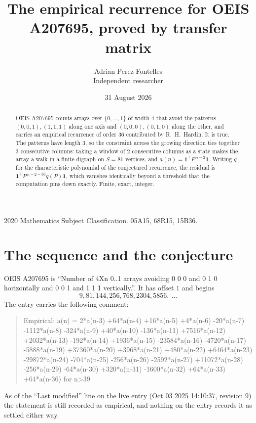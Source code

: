 \documentclass[11pt,a4paper]{article}
\title{The empirical recurrence for OEIS A207695, proved by transfer matrix}
\author{Adrian Perez Fontelles\\ \small Independent researcher}
\date{31 August 2026}
\theoremstyle{plain}
\theoremstyle{definition}
\begin{document}
\maketitle

\begin{abstract}
OEIS A207695 counts arrays over $\{0,\dots,1\}$ of width $4$ that avoid the patterns
$(0,0,1), (1,1,1)$ along one axis and $(0,0,0), (0,1,0)$ along the other, and carries an empirical recurrence of
order $36$ contributed by R.~H.~Hardin. It is true. The patterns have length $3$, so
the constraint across the growing direction ties together $3$ consecutive columns: taking a
window of $2$ consecutive columns as a state makes the array a walk in a finite digraph
on $S=81$ vertices, and $a(n)=\mathbf{1}^{\!\top}P^{\,n-2}\mathbf{1}$. Writing $q$
for the characteristic polynomial of the conjectured recurrence, the residual is
$\mathbf{1}^{\!\top}P^{\,n-2-36}q(P)\mathbf{1}$, which vanishes identically
beyond a threshold that the computation pins down exactly. Finite, exact, integer.
\end{abstract}

\noindent\small 2020 Mathematics Subject Classification. 05A15, 68R15, 15B36.\normalsize

\section{The sequence and the conjecture}

OEIS A207695 is ``Number of 4Xn 0..1 arrays avoiding 0 0 0 and 0 1 0 horizontally and 0 0 1 and 1 1 1 vertically.''. It has offset
$1$ and begins
\[
9, 81, 144, 256, 768, 2304, 5856,\ \dots
\]
The entry carries the following comment:
\begin{quote}\small
Empirical: a(n) = 2*a(n-3) +64*a(n-4) +16*a(n-5) +4*a(n-6) -20*a(n-7) -1112*a(n-8) -324*a(n-9) +40*a(n-10) -136*a(n-11) +7516*a(n-12) +2032*a(n-13) -192*a(n-14) +1936*a(n-15) -23584*a(n-16) -4720*a(n-17) -5888*a(n-19) +37360*a(n-20) +3968*a(n-21) +480*a(n-22) +6464*a(n-23) -29872*a(n-24) -704*a(n-25) -256*a(n-26) -2592*a(n-27) +11072*a(n-28) -256*a(n-29) -64*a(n-30) +320*a(n-31) -1600*a(n-32) +64*a(n-33) +64*a(n-36) for n>39
\end{quote}
As of the ``Last modified'' line on the live entry (Oct 03 2025 14:10:37, revision
9) the statement is still recorded as empirical, and nothing on the entry
records it as settled either way.
\end{document}
